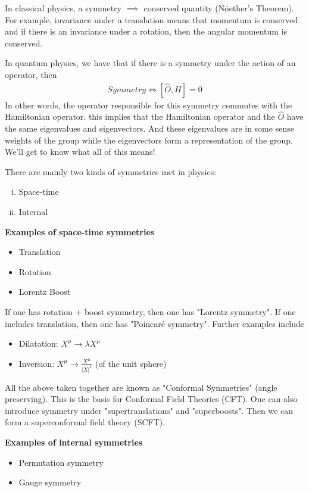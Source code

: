 In classical physics, a symmetry \(\implies \) conserved quantity (Nöether's Theorem). For example, invariance under a translation means that momentum is conserved and if there is an invariance under a rotation, then the angular momentum is conserved.

In quantum physics, we have that if there is a symmetry under the action of an operator, then \begin{align*}
    \textit{Symmetry} \iff  \left[ \hat{O}, H \right] = 0
\end{align*}
In other words, the operator responsible for this symmetry commutes with the Hamiltonian operator. this implies that the Hamiltonian operator and the \(\hat{O}\) have the same eigenvalues and eigenvectors. And these eigenvalues are in some sense weights of the group while the eigenvectors form a representation of the group. We'll get to know what all of this means!

There are mainly two kinds of symmetries met in physics: \begin{enumerate}[i)]
    \item Space-time 
    \item Internal
\end{enumerate}

\textbf{Examples of space-time symmetries} \begin{itemize}
    \item Translation
    \item Rotation
    \item Lorentz Boost
\end{itemize} 
If one has rotation + boost symmetry, then one has "Lorentz symmetry". If one includes translation, then one has "Poincaré symmetry". Further examples include \begin{itemize}
    \item Dilatation: \(X^{\mu} \to  \lambda  X^\mu \)
    \item Inversion: \(X^\mu \to  \frac{X^\mu}{\left| X \right| ^{2} }\) (of the unit sphere)
\end{itemize}

All the above taken together are known as "Conformal Symmetries" (angle preserving). This is the basis for Conformal Field Theories (CFT). One can also introduce symmetry under "supertranslations" and "superboosts". Then we can form a superconformal field theory (SCFT).

\textbf{Examples of internal symmetries}
\begin{itemize}
    \item Permutation symmetry
    \item Gauge symmetry
\end{itemize} 

